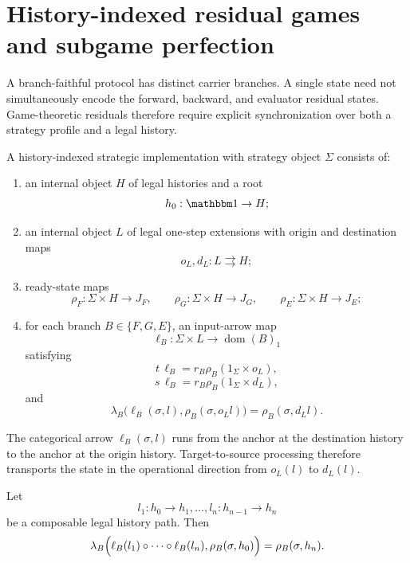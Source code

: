 \section{History-indexed residual games and subgame perfection}
\label{sec:history-indexed-residual-games}

A branch-faithful protocol has distinct carrier branches. A single state need not simultaneously
encode the forward, backward, and evaluator residual states. Game-theoretic residuals therefore
require explicit synchronization over both a strategy profile and a legal history.

\begin{definition}
\label{def:history-indexed-strategic-implementation}
A history-indexed strategic implementation with strategy object \(\Sigma\) consists of:
\begin{enumerate}
  \item an internal object \(H\) of legal histories and a root
  \[
    h_0:\mathbbm1\to H;
  \]
  \item an internal object \(L\) of legal one-step extensions with origin and destination maps
  \[
    o_L,d_L:L\rightrightarrows H;
  \]
  \item ready-state maps
  \[
    \rho_F:\Sigma\times H\to J_F,
    \qquad
    \rho_G:\Sigma\times H\to J_G,
    \qquad
    \rho_E:\Sigma\times H\to J_E;
  \]
  \item for each branch \(B\in\{F,G,E\}\), an input-arrow map
  \[
    \ell_B:
    \Sigma\times L
    \longrightarrow
    \operatorname{dom}(B)_1
  \]
  satisfying
  \[
    t\,\ell_B
    =
    r_B\rho_B(1_\Sigma\times o_L),
  \]
  \[
    s\,\ell_B
    =
    r_B\rho_B(1_\Sigma\times d_L),
  \]
  and
  \[
    \lambda_B
    \bigl(
      \ell_B(\sigma,l),
      \rho_B(\sigma,o_Ll)
    \bigr)
    =
    \rho_B(\sigma,d_Ll).
  \]
\end{enumerate}
\end{definition}

The categorical arrow \(\ell_B(\sigma,l)\) runs from the anchor at the destination history to the
anchor at the origin history. Target-to-source processing therefore transports the state in the
operational direction from \(o_L(l)\) to \(d_L(l)\).

\begin{lemma}
\label{lem:history-path-transport}
Let
\[
  l_1:h_0\to h_1,
  \ldots,
  l_n:h_{n-1}\to h_n
\]
be a composable legal history path. Then
\[
  \lambda_B
  \Bigl(
    \ell_B(l_1)\circ\cdots\circ\ell_B(l_n),
    \rho_B(\sigma,h_0)
  \Bigr)
  =
  \rho_B(\sigma,h_n).
\]
\end{lemma}

